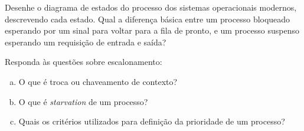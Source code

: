 \question[1,5] Desenhe o diagrama de estados do processo dos sistemas
operacionais modernos, descrevendo cada estado. Qual a diferença
básica entre um processo bloqueado esperando por um sinal para voltar
para a fila de pronto, e um processo suspenso esperando um requisição
de entrada e saída?


\question[1,5]  Responda às questões sobre escalonamento:

\begin{enumerate}[a)]
\item O que é troca ou chaveamento de
contexto? 
\item O que é {\it starvation} de um processo? 
\item Quais os critérios utilizados para definição da prioridade de um processo?
\end{enumerate}




